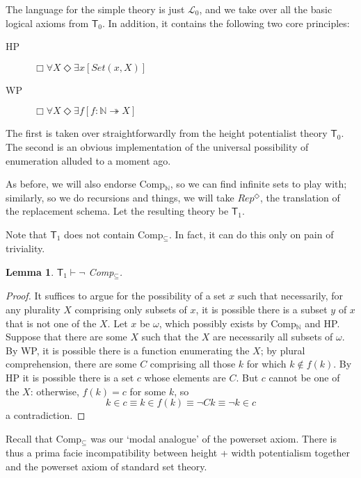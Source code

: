 \documentclass{article}
\newtheorem{lemma}{Lemma}
\begin{document}
The language for the simple theory is just $\mathcal{L}_0$, and we
take over all the basic logical axioms from $\mathsf{T}_0$.
In addition, it contains the following two core principles:
\begin{description} 
    \item[HP] $\Box \forall X \Diamond \exists x [Set(x, X)]$
    \item[WP] $\Box \forall X \Diamond \exists f[f : \mathbb{N} \twoheadrightarrow X]$
\end{description}
The first is taken over straightforwardly from the height potentialist theory $\mathsf{T}_0$.
The second is an obvious implementation of the universal possibility of enumeration 
alluded to a moment ago. 

As before, we will also endorse Comp$_\mathbb{N}$, so we can find infinite 
sets to play with; similarly, so we do recursions and things, we will 
take $Rep^\Diamond$, the translation of the replacement schema. Let the resulting theory 
be $\mathsf{T}_1$.

Note that $\mathsf{T}_1$ does not contain Comp$_\subseteq$. In fact, it can 
do this only on pain of triviality.

\begin{lemma}
$\mathsf{T}_1 \vdash \neg$ Comp$_\subseteq$.
\end{lemma}
\begin{proof}
    It suffices to argue for the possibility of a set $x$ such that necessarily, 
    for any plurality $X$ comprising only subsets of $x$, it is possible there is a 
    subset $y$ of $x$ that is not one of the $X$. Let $x$ be $\omega$, which 
    possibly exists by Comp$_\mathbb{N}$ and HP. Suppose that there are some $X$ such 
    that the $X$ are necessarily all subsets of $\omega$. By WP, it is possible 
    there is a function enumerating the $X$; by plural comprehension, there are 
    some $C$ comprising all those $k$ for which $k \not \in f(k)$. By HP it is possible 
    there is a set $c$ whose elements are $C$. But $c$ cannot be one of the $X$: 
    otherwise, $f(k) = c$ for some $k$, so
    $$k \in c \equiv k \in f(k) \equiv \neg Ck \equiv \neg k \in c$$
    a contradiction. 
\end{proof}
Recall that Comp$_\subseteq$ was our `modal analogue' of the powerset axiom. There is thus 
a prima facie incompatibility between height + width potentialism together and 
the powerset axiom of standard set theory. 
\end{document}
